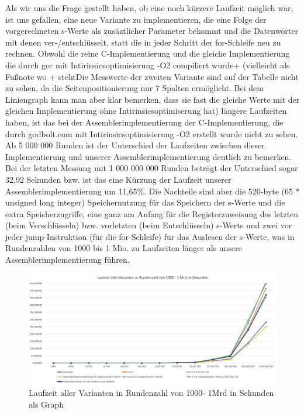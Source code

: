 \documentclass[course=asp]{aspdoc}
\begin{document}
Als wir uns die Frage gestellt haben, ob eine noch kürzere Laufzeit möglich war, ist uns gefallen, eine neue Variante
zu implementieren, die eine Folge der vorgerechneten s-Werte als zusäztlicher Parameter bekommt und die Datenwörter
mit denen ver-/entschlüsselt, statt die in jeder Schritt der for-Schleife neu zu rechnen. Obwohl die reine C-Implementierung
und die gleiche Implementierung die durch gcc mit Intirinsicsoptimisierung -O2 compiliert wurde+
(vielleicht als Fußnote wo + stehtDie Messwerte der zweiten Variante sind auf der Tabelle nicht zu sehen,
da die Seitenpositionierung nur 7 Spalten ermöglicht. Bei dem Liniengraph kann man aber klar bemerken,
dass sie fast die gleiche Werte mit der gleichen Implementierung ohne Intirinsicsoptimiserung hat) längere Laufzeiten
haben, ist das bei der Assemblerimplementierung der C-Implementierung, die durch godbolt.com mit Intirinsicsoptimisierung
-O2 erstellt wurde nicht zu sehen. Ab 5 000 000 Runden ist der Unterschied der Laufzeiten zwischen dieser Implementierung
und unserer Assemblerimplementierung deutlich zu bemerken. Bei der letzten Messung mit 1 000 000 000 Runden beträgt
der Unterschied sogar 32,92 Sekunden bzw. ist das eine Kürzung der Laufzeit unserer Assemblerimplementierung um
11,65\%. Die Nachteile sind aber die 520-byte (65 * unsigned long integer) Speichernutzung für das Speichern der
s-Werte und die extra Speicherzugriffe, eine ganz am Anfang für die Registerzuweisung des letzten (beim Verschlüsseln)
bzw. vorletzten (beim Entschlüsseln) s-Werts und zwei vor jeder jump-Instruktion (für die for-Schleife) für das Auslesen
der s-Werte, was in Rundenzahlen von 1000 bis 1 Mio. zu Laufzeiten länger als unsere Assemblerimplementierung führen.

\begin{figure}[h]
\centering
\includegraphics[scale = 0.4]{Analyse.png}
\caption{Laufzeit aller Varianten in Rundenzahl von 1000- 1Mrd in Sekunden als Graph}
\end{figure}
\newpage
\end{document}
